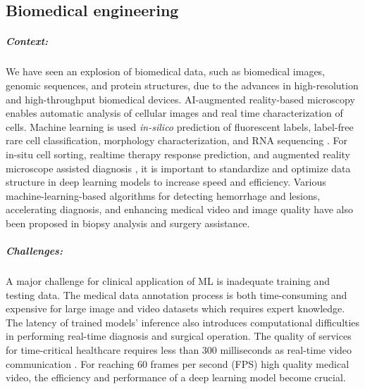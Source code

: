 \subsection{Biomedical engineering}

\subparagraph*{Context:} We have seen an explosion of biomedical data, such as biomedical images, genomic sequences, and protein structures, due to the advances in high-resolution and high-throughput biomedical devices. AI-augmented reality-based microscopy \cite{Chen2019-ze} enables automatic analysis of cellular images and real time characterization of cells. Machine learning is used \textit{in-silico} prediction of fluorescent labels, label-free rare cell classification, morphology characterization, and RNA sequencing \cite{Christiansen2018-eu,Wang2020-lr,Siu2020-kd,Tang2018-mj,Li2020-cx}. For in-situ cell sorting, realtime therapy response prediction, and augmented reality microscope assisted diagnosis \cite{Chen2019-ze,Nitta2018-bc,Sakellaropoulos2019-tq}, it is important to standardize and optimize data structure in deep learning models to increase speed and efficiency. Various machine-learning-based algorithms for detecting hemorrhage and lesions, accelerating diagnosis, and enhancing medical video and image quality have also been proposed in biopsy analysis and surgery assistance.
        
\subparagraph*{Challenges:} A major challenge for clinical application of ML is inadequate training and testing data. The medical data annotation process is both time-consuming and expensive for large image and video datasets which requires expert knowledge. The latency of trained models’ inference also introduces computational difficulties in performing real-time diagnosis and surgical operation. The quality of services for time-critical healthcare requires less than 300 milliseconds as real-time video communication \cite{Shukla2019-bz}. For reaching 60 frames per second (FPS) high quality medical video, the efficiency and performance of a deep learning model become crucial.
        
